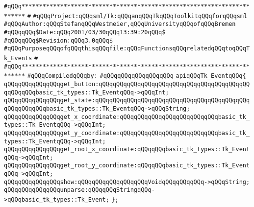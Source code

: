 \label{src/lib/tk/src/tk_event.api}
\verb|#qQQq***********************************************************************|\newline
\verb|#|\newline
\verb|#qQQqProject:qQQqsml/Tk:qQQqanqQQqTkqQQqToolkitqQQqforqQQqsml|\newline
\verb|#qQQqAuthor:qQQqStefanqQQqWestmeier,qQQqUniversityqQQqofqQQqBremen|\newline
\verb|#qQQqqQQq$Date:qQQq2001/03/30qQQq13:39:20qQQq$|\newline
\verb|#qQQqqQQq$Revision:qQQq3.0qQQq$|\newline
\verb|#qQQqPurposeqQQqofqQQqthisqQQqfile:qQQqFunctionsqQQqrelatedqQQqtoqQQqTk_Events|\newline
\verb|#|\newline
\verb|#qQQq***********************************************************************|\newline
\newline
\verb|#qQQqCompiledqQQqby:|\newline
\verb|#qQQqqQQqqQQqqQQqqQQq|\newline
\newline
\verb|apiqQQqTk_EventqQQq{|\newline
\newline
\verb|qQQqqQQqqQQqqQQqget_button:qQQqqQQqqQQqqQQqqQQqqQQqqQQqqQQqqQQqqQQqqQQqqQQqqQQqbasic_tk_types::Tk_EventqQQq->qQQqInt;|\newline
\verb|qQQqqQQqqQQqqQQqget_state:qQQqqQQqqQQqqQQqqQQqqQQqqQQqqQQqqQQqqQQqqQQqqQQqqQQqqQQqbasic_tk_types::Tk_EventqQQq->qQQqString;|\newline
\verb|qQQqqQQqqQQqqQQqget_x_coordinate:qQQqqQQqqQQqqQQqqQQqqQQqqQQqbasic_tk_types::Tk_EventqQQq->qQQqInt;|\newline
\verb|qQQqqQQqqQQqqQQqget_y_coordinate:qQQqqQQqqQQqqQQqqQQqqQQqqQQqbasic_tk_types::Tk_EventqQQq->qQQqInt;|\newline
\verb|qQQqqQQqqQQqqQQqget_root_x_coordinate:qQQqqQQqbasic_tk_types::Tk_EventqQQq->qQQqInt;|\newline
\verb|qQQqqQQqqQQqqQQqget_root_y_coordinate:qQQqqQQqbasic_tk_types::Tk_EventqQQq->qQQqInt;|\newline
\newline
\verb|qQQqqQQqqQQqqQQqshow:qQQqqQQqqQQqqQQqqQQqVoidqQQqqQQqqQQq->qQQqString;|\newline
\verb|qQQqqQQqqQQqqQQqunparse:qQQqqQQqStringqQQq->qQQqbasic_tk_types::Tk_Event;|\newline
\verb|};|\newline

